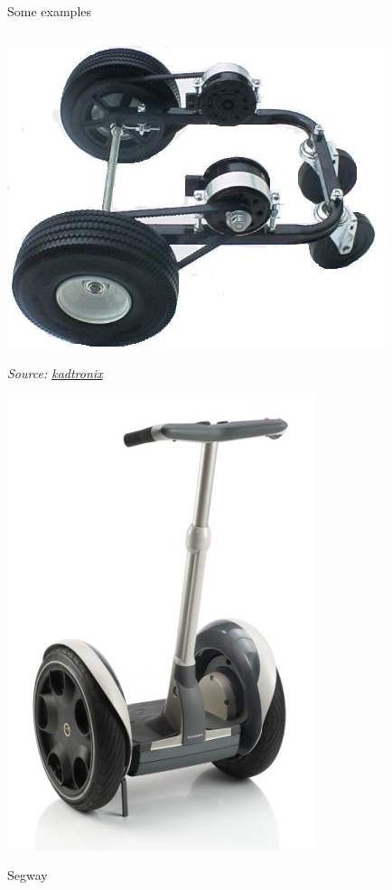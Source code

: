 \documentclass[compress]{beamer}
\newcommand{\source}[2]{{\tiny\it Source: \href{#1}{#2}}}
\begin{document}
\begin{frame}{Some examples}

    \begin{columns}
        \begin{column}{0.5\linewidth}

            \begin{center}
                \includegraphics[width=0.7\linewidth]{differentialdrive_ex1}

                \source{www.kadtronix.com}{kadtronix}


                \includegraphics[width=0.4\linewidth]{differentialdrive_ex3}

                Segway
            \end{center}


\end{column}
\end{columns}
\end{frame}
\end{document}
